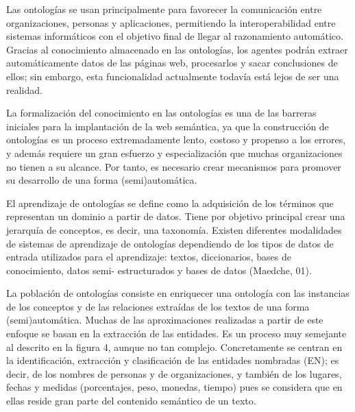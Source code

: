 Las ontologías se usan principalmente para favorecer la comunicación entre organizaciones, personas y aplicaciones, permitiendo la interoperabilidad entre sistemas informáticos con el objetivo final de llegar al razonamiento automático. Gracias al conocimiento almacenado en las ontologías, los agentes podrán extraer automáticamente datos de las páginas web, procesarlos y sacar conclusiones de ellos; sin embargo, esta funcionalidad actualmente todavía está lejos de ser una realidad.

La formalización del conocimiento en las ontologías es una de las barreras iniciales para la implantación de la web semántica, ya que la construcción de ontologías es un proceso extremadamente lento, costoso y propenso a los errores, y además requiere un gran esfuerzo y especialización que muchas organizaciones no tienen a su alcance. Por tanto, es necesario crear mecanismos para promover su desarrollo de una forma (semi)automática.


El aprendizaje de ontologías se define como la adquisición de los términos que representan un dominio a partir de datos. Tiene por objetivo principal crear una jerarquía de conceptos, es decir, una taxonomía. Existen diferentes modalidades de sistemas de aprendizaje de ontologías dependiendo de los tipos de datos de entrada utilizados para el aprendizaje: textos, diccionarios, bases de conocimiento, datos semi- estructurados y bases de datos (Maedche, 01).


La población de ontologías consiste en enriquecer una ontología con las instancias de los conceptos y de las relaciones extraídas de los textos de una forma (semi)automática. Muchas de las aproximaciones realizadas a partir de este enfoque se basan en la extracción de las entidades. Es un proceso muy semejante al descrito en la figura 4, aunque no tan complejo. Concretamente se centran en la identificación, extracción y clasificación de las entidades nombradas (EN); es decir, de los nombres de personas y de organizaciones, y también de los lugares, fechas y medidas (porcentajes, peso, monedas, tiempo) pues se considera que en ellas reside gran parte del contenido semántico de un texto.

